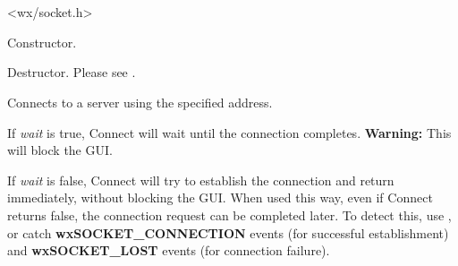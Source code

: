 
\section{}\label{wxsocketclient}




<wx/socket.h>


%
%
\label{wxsocketclientctor}


Constructor.



%
%
\label{wxsocketclientdtor}


Destructor. Please see .

%
%
\label{wxsocketclientconnect}


Connects to a server using the specified address.

If {\it wait} is true, Connect will wait until the connection
completes. {\bf Warning:} This will block the GUI.

If {\it wait} is false, Connect will try to establish the connection and
return immediately, without blocking the GUI. When used this way, even if
Connect returns false, the connection request can be completed later.
To detect this, use ,
or catch {\bf wxSOCKET\_CONNECTION} events (for successful establishment)
and {\bf wxSOCKET\_LOST} events (for connection failure).

